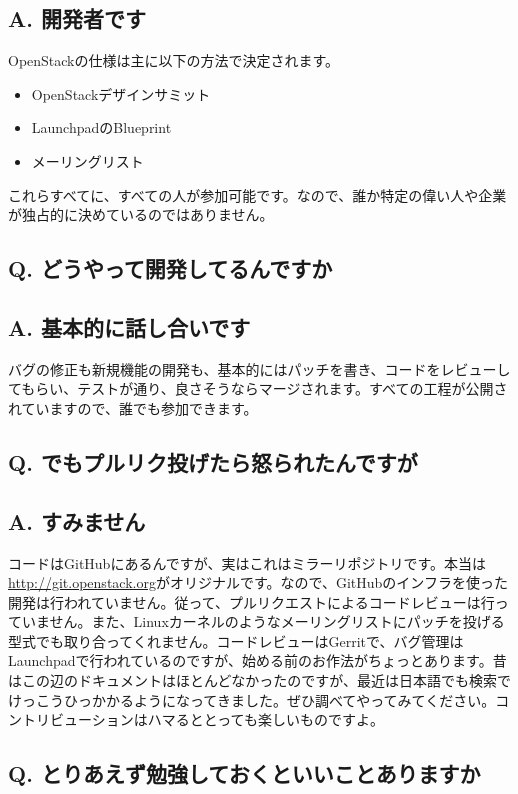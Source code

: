 \documentclass[9pt,b5paper,tombo,openany]{jsbook}
\begin{document}
\subsection*{{\LARGE\bfseries A.} 開発者です}
OpenStackの仕様は主に以下の方法で決定されます。
\begin{itemize}
	\item OpenStackデザインサミット
	\item LaunchpadのBlueprint
	\item メーリングリスト
\end{itemize}
これらすべてに、すべての人が参加可能です。なので、誰か特定の偉い人や企業が独占的に決めているのではありません。

\subsection*{{\LARGE\bfseries Q.} どうやって開発してるんですか}
\subsection*{{\LARGE\bfseries A.} 基本的に話し合いです}
バグの修正も新規機能の開発も、基本的にはパッチを書き、コードをレビューしてもらい、テストが通り、良さそうならマージされます。すべての工程が公開されていますので、誰でも参加できます。

\subsection*{{\LARGE\bfseries Q.} でもプルリク投げたら怒られたんですが}
\subsection*{{\LARGE\bfseries A.} すみません}
コードはGitHubにあるんですが、実はこれはミラーリポジトリです。本当は\url{http://git.openstack.org}がオリジナルです。なので、GitHubのインフラを使った開発は行われていません。従って、プルリクエストによるコードレビューは行っていません。また、Linuxカーネルのようなメーリングリストにパッチを投げる型式でも取り合ってくれません。コードレビューはGerritで、バグ管理はLaunchpadで行われているのですが、始める前のお作法がちょっとあります。昔はこの辺のドキュメントはほとんどなかったのですが、最近は日本語でも検索でけっこうひっかかるようになってきました。ぜひ調べてやってみてください。コントリビューションはハマるととっても楽しいものですよ。

\subsection*{{\LARGE\bfseries Q.} とりあえず勉強しておくといいことありますか}
\end{document}
